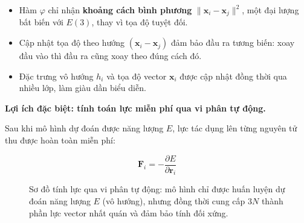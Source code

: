 \begin{itemize}
    \item Hàm $\varphi$ chỉ nhận \textbf{khoảng cách bình phương} $\|\mathbf{x}_i - \mathbf{x}_j\|^2$, một đại lượng bất biến với $E(3)$, thay vì tọa độ tuyệt đối.
    \item Cập nhật tọa độ theo hướng $(\mathbf{x}_i - \mathbf{x}_j)$ đảm bảo đầu ra tương biến: xoay đầu vào thì đầu ra cũng xoay theo đúng cách đó.
    \item Đặc trưng vô hướng $h_i$ và tọa độ vector $\mathbf{x}_i$ được cập nhật đồng thời qua nhiều lớp, làm giàu dần biểu diễn.
\end{itemize}

\textbf{Lợi ích đặc biệt: tính toán lực miễn phí qua vi phân tự động.}

Sau khi mô hình dự đoán được năng lượng $E$, lực tác dụng lên từng nguyên tử thu được hoàn toàn miễn phí:

\begin{equation}
    \mathbf{F}_i = -\frac{\partial E}{\partial \mathbf{r}_i}
    \label{eq:force-autograd}
\end{equation}

\begin{figure}[H]
\centering
{}
\caption{Sơ đồ tính lực qua vi phân tự động: mô hình chỉ được huấn luyện dự đoán năng lượng $E$ (vô hướng), nhưng đồng thời cung cấp $3N$ thành phần lực vector nhất quán và đảm bảo tính đối xứng.}
\label{fig:force-autograd}
\end{figure}

